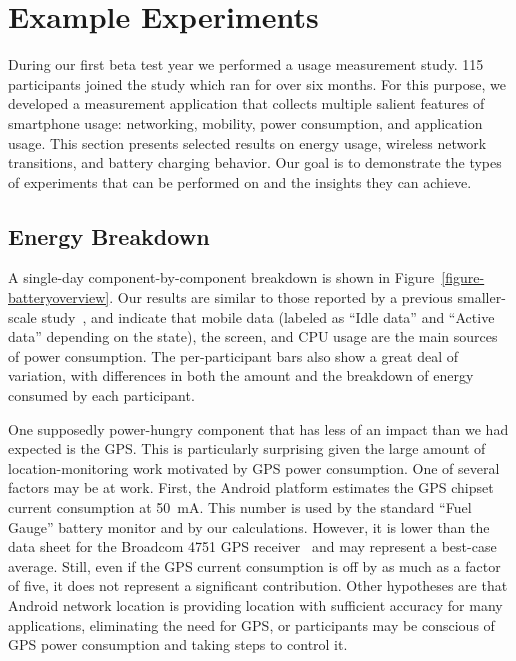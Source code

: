\section{Example Experiments}
\label{sec-experiments}

During our first beta test year we performed a usage measurement study. 115
participants joined the study which ran for over six months. For this
purpose, we developed a measurement application that collects multiple
salient features of smartphone usage: networking, mobility, power
consumption, and application usage. This section presents selected results on
energy usage, wireless network transitions, and battery charging behavior.
Our goal is to demonstrate the types of experiments that can be performed on
\PhoneLab{} and the insights they can achieve.

\subsection{Energy Breakdown}
\label{subsec-energybreakdown}

A single-day component-by-component breakdown is shown in
Figure~\ref{figure-batteryoverview}. Our results are similar to those reported
by a previous smaller-scale study~\cite{shye:micro:2009}, and indicate that
mobile data (labeled as ``Idle data'' and ``Active data'' depending on the
state), the screen, and CPU usage are the main sources of power consumption. The
per-participant bars also show a great deal of variation, with differences in
both the amount and the breakdown of energy consumed by each participant.

One supposedly power-hungry component that has less of an impact than we had
expected is the GPS. This is particularly surprising given the large amount
of location-monitoring work motivated by GPS power consumption. One of
several factors may be at work. First, the Android platform estimates the GPS
chipset current consumption at 50~mA. This number is used by the standard
``Fuel Gauge'' battery monitor and by our calculations. However, it is lower
than the data sheet for the Broadcom 4751 GPS receiver~\cite{bcm4751} and may
represent a best-case average. Still, even if the GPS current consumption is
off by as much as a factor of five, it does not represent a significant
contribution. Other hypotheses are that Android network location is providing
location with sufficient accuracy for many applications, eliminating the need
for GPS, or participants may be conscious of GPS power consumption and taking
steps to control it.

